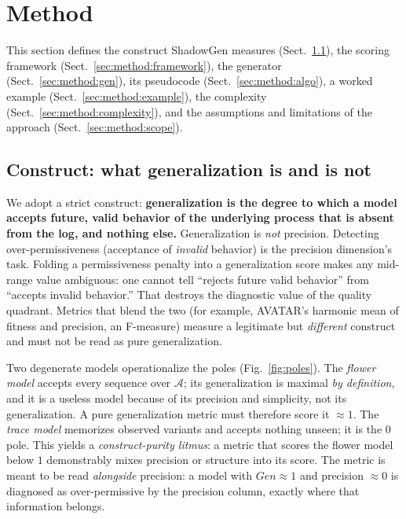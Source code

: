 \documentclass[runningheads]{llncs}
\begin{document}
\section{Method}
\label{sec:method}
This section defines the construct ShadowGen measures (Sect.~\ref{sec:method:construct}), the scoring framework (Sect.~\ref{sec:method:framework}), the generator (Sect.~\ref{sec:method:gen}), its pseudocode (Sect.~\ref{sec:method:algo}), a worked example (Sect.~\ref{sec:method:example}), the complexity (Sect.~\ref{sec:method:complexity}), and the assumptions and limitations of the approach (Sect.~\ref{sec:method:scope}).

\subsection{Construct: what generalization is and is not}
\label{sec:method:construct}
We adopt a strict construct: \textbf{generalization is the degree to which a model accepts future, valid behavior of the underlying process that is absent from the log, and nothing else.} Generalization is \emph{not} precision. Detecting over-permissiveness (acceptance of \emph{invalid} behavior) is the precision dimension's task. Folding a permissiveness penalty into a generalization score makes any mid-range value ambiguous: one cannot tell ``rejects future valid behavior'' from ``accepts invalid behavior.'' That destroys the diagnostic value of the quality quadrant. Metrics that blend the two (for example, AVATAR's harmonic mean of fitness and precision, an F-measure) measure a legitimate but \emph{different} construct and must not be read as pure generalization.

Two degenerate models operationalize the poles (Fig.~\ref{fig:poles}). The \emph{flower model} accepts every sequence over $\mathcal{A}$; its generalization is maximal \emph{by definition}, and it is a useless model because of its precision and simplicity, not its generalization. A pure generalization metric must therefore score it $\approx 1$. The \emph{trace model} memorizes observed variants and accepts nothing unseen; it is the $0$ pole. This yields a \emph{construct-purity litmus}: a metric that scores the flower model below $1$ demonstrably mixes precision or structure into its score. The metric is meant to be read \emph{alongside} precision: a model with $\mathit{Gen}\approx 1$ and precision $\approx 0$ is diagnosed as over-permissive by the precision column, exactly where that information belongs.
\end{document}
